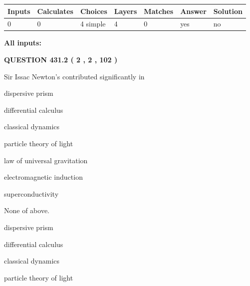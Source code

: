 \documentclass[12pt]{article}
\begin{document}
 
   
   
   
   
\noindent\begin{tabular}{|l|l|l|l|l|l|l|}
 \hline
Inputs & Calculates & Choices & Layers & Matches & Answer & Solution \\ \hline
 0  & 
 0  & 
 4
  simple  
  & 
 4  & 
 0  & 
  yes & 
  no 
  \\ \hline
 \end{tabular}
   
   
   
   
\noindent{}
   
   
   
   
\noindent\vspace{0.1in}\hspace{-0.08in} {\textbf{\Large{All inputs: }}}
   
   
  
\vspace{0.2in}
  
{\textbf{\Large{QUESTION
431.2 
 ( 2 , 2 , 102 )
}}}
  
  
Sir Issac Newton's contributed significantly in
 
 
dispersive prism
 
 
differential calculus
 
 
classical dynamics
 
 
particle theory of light
 
 
law of universal gravitation
 
 
electromagnetic induction
 
 
superconductivity
 
 
 None of above.
 
 
\noindent{}
 
 
dispersive prism
 
 
differential calculus
 
 
classical dynamics
 
 
particle theory of light
 
\end{document}
